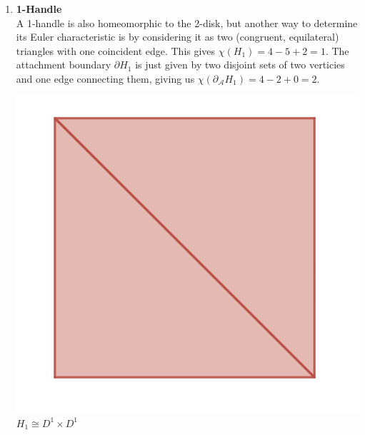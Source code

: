 \documentclass[12pt]{article}
\newcommand{\cA}{{\mathcal A}}
\theoremstyle{definition}
\begin{document}
\begin{enumerate}
\begin{center}
		  \end{center}
      \item \textbf{1-Handle}\\
            A 1-handle is also homeomorphic to the 2-disk, but another way to determine its Euler characteristic is by considering it as two (congruent, equilateral) triangles with one coincident edge. This gives $\chi(H_1) = 4 - 5+ 2 = 1$. The attachment boundary $\partial H_1$ is just given by two disjoint sets of two verticies and one edge connecting them, giving us $\chi(\partial_\cA H_1) = 4 - 2 + 0 = 2$. 
            \begin{center}
                  \includegraphics[scale=0.5]{square.png} \\
                  $H_1 \cong D^1\times D^1$


\end{center}
\end{enumerate}
\end{document}
